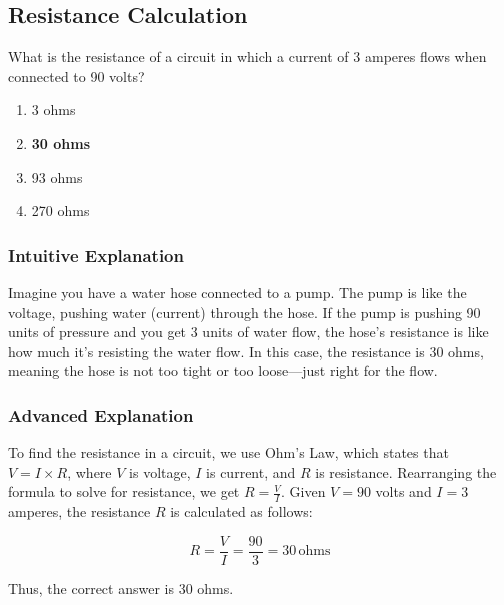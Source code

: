 \subsection{Resistance Calculation} \label{T5D04}

\begin{tcolorbox}[colback=gray!10!white,colframe=black!75!black,title=T5D04]
What is the resistance of a circuit in which a current of 3 amperes flows when connected to 90 volts?
\begin{enumerate}[noitemsep]
    \item 3 ohms
    \item \textbf{30 ohms}
    \item 93 ohms
    \item 270 ohms
\end{enumerate}
\end{tcolorbox}

\subsubsection*{Intuitive Explanation}
Imagine you have a water hose connected to a pump. The pump is like the voltage, pushing water (current) through the hose. If the pump is pushing 90 units of pressure and you get 3 units of water flow, the hose's resistance is like how much it's resisting the water flow. In this case, the resistance is 30 ohms, meaning the hose is not too tight or too loose—just right for the flow.

\subsubsection*{Advanced Explanation}
To find the resistance in a circuit, we use Ohm's Law, which states that \( V = I \times R \), where \( V \) is voltage, \( I \) is current, and \( R \) is resistance. Rearranging the formula to solve for resistance, we get \( R = \frac{V}{I} \). Given \( V = 90 \) volts and \( I = 3 \) amperes, the resistance \( R \) is calculated as follows:

\[
R = \frac{V}{I} = \frac{90}{3} = 30 \, \text{ohms}
\]

Thus, the correct answer is 30 ohms.